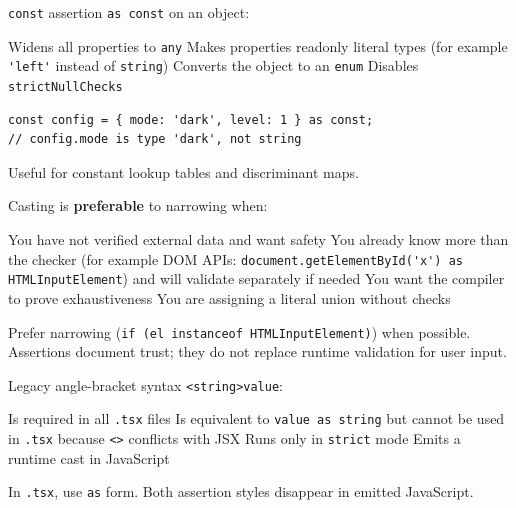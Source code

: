 \question[4]
\texttt{const} assertion \lstinline[style=tsinline]|as const| on an object:
\begin{choices}
  \choice Widens all properties to \lstinline[style=tsinline]|any|
  \CorrectChoice Makes properties readonly literal types (for example \lstinline[style=tsinline]|'left'| instead of \lstinline[style=tsinline]|string|)
  \choice Converts the object to an \lstinline[style=tsinline]|enum|
  \choice Disables \lstinline[style=tsinline]|strictNullChecks|
\end{choices}
\begin{solution}
\begin{lstlisting}[style=ts]
const config = { mode: 'dark', level: 1 } as const;
// config.mode is type 'dark', not string
\end{lstlisting}
  Useful for constant lookup tables and discriminant maps.
\end{solution}

\question[4]
Casting is \textbf{preferable} to narrowing when:
\begin{choices}
  \choice You have not verified external data and want safety
  \CorrectChoice You already know more than the checker (for example DOM APIs: \lstinline[style=tsinline]|document.getElementById('x') as HTMLInputElement|) and will validate separately if needed
  \choice You want the compiler to prove exhaustiveness
  \choice You are assigning a literal union without checks
\end{choices}
\begin{solution}
  Prefer narrowing (\lstinline[style=tsinline]|if (el instanceof HTMLInputElement)|) when possible. Assertions document trust; they do not replace runtime validation for user input.
\end{solution}

\question[4]
Legacy angle-bracket syntax \lstinline[style=tsinline]|<string>value|:
\begin{choices}
  \choice Is required in all \texttt{.tsx} files
  \CorrectChoice Is equivalent to \lstinline[style=tsinline]|value as string| but cannot be used in \texttt{.tsx} because \texttt{<>} conflicts with JSX
  \choice Runs only in \texttt{strict} mode
  \choice Emits a runtime cast in JavaScript
\end{choices}
\begin{solution}
  In \texttt{.tsx}, use \lstinline[style=tsinline]|as| form. Both assertion styles disappear in emitted JavaScript.
\end{solution}

